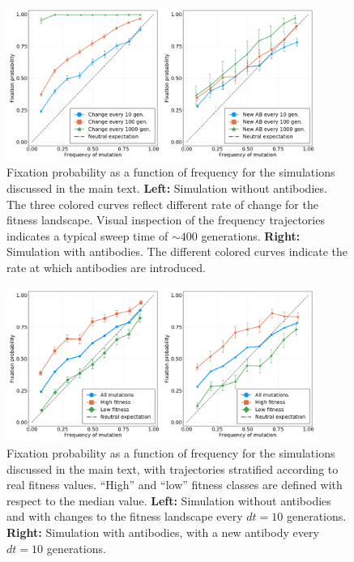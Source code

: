 \documentclass[reprint,amsmath,amssymb,superscriptaddress,showpacs,rmp]{revtex4-1}
\begin{document}
	\begin{figure}
		\centering
		\includegraphics[width=0.9\textwidth]{SM_figures/simulation.png}
		\caption{Fixation probability as a function of frequency for the simulations discussed in the main text. \textbf{Left:} Simulation without antibodies. The three colored curves reflect different rate of change for the fitness landscape. Visual inspection of the frequency trajectories indicates a typical sweep time of $\sim400$ generations. \textbf{Right:} Simulation with antibodies. The different colored curves indicate the rate at which antibodies are introduced. }
		\label{fig:simulations}
	\end{figure}

	\begin{figure}
		\centering
		\includegraphics[width=0.9\textwidth]{SM_figures/simulation_fitness.png}
		\caption{Fixation probability as a function of frequency for the simulations discussed in the main text, with trajectories stratified according to real fitness values. ``High'' and ``low'' fitness classes are defined with respect to the median value. \textbf{Left:} Simulation without antibodies and with changes to the fitness landscape every $dt=10$ generations. \textbf{Right:} Simulation with antibodies, with a new antibody every $dt=10$ generations. }
		\label{fig:simulations_fitness}
	\end{figure}



\end{document}
